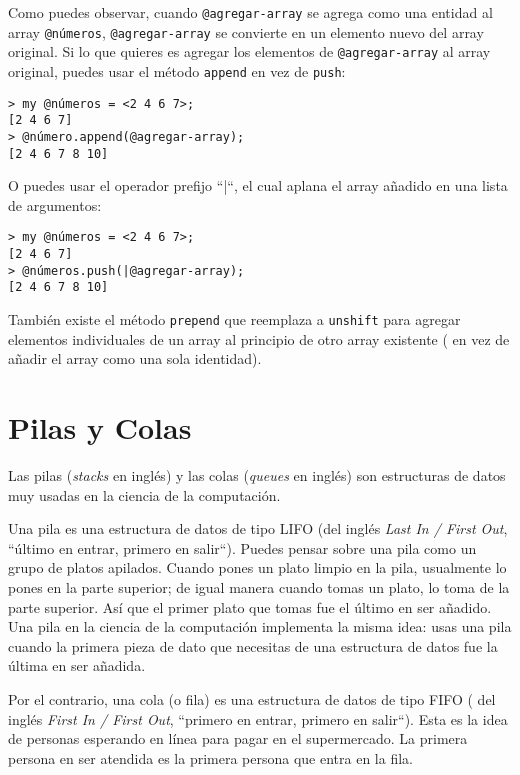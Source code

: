 Como puedes observar, cuando \verb|@agregar-array| se agrega
como una entidad al array \verb|@números|, \verb|@agregar-array|
se convierte en un elemento nuevo del array original. Si lo que 
quieres es agregar los elementos de \verb|@agregar-array| 
al array original, puedes usar el método {\tt append} en vez 
de {\tt push}:

\begin{lstlisting}
> my @números = <2 4 6 7>;
[2 4 6 7]
> @número.append(@agregar-array);
[2 4 6 7 8 10]
\end{lstlisting}

O puedes usar el operador prefijo ``|``, el cual aplana
el array añadido en una lista de argumentos:

\begin{lstlisting}
> my @números = <2 4 6 7>;
[2 4 6 7]
> @números.push(|@agregar-array);
[2 4 6 7 8 10]
\end{lstlisting}

También existe el método {\tt prepend} que reemplaza 
a {\tt unshift} para agregar elementos individuales 
de un array al principio de otro array existente (
en vez de añadir el array como una sola identidad).

\section{Pilas y Colas}
\label{stacks_queues}

Las pilas (\emph{stacks} en inglés) y las colas ({\emph{queues} en inglés}) son 
estructuras de datos muy usadas en la ciencia de la computación.

Una pila es una estructura de datos de tipo LIFO (del inglés 
\emph{Last In / First Out}, ``último en entrar, primero en salir``).
Puedes pensar sobre una pila como un grupo de platos apilados. Cuando
pones un plato limpio en la pila, usualmente lo pones en la parte superior;
de igual manera cuando tomas un plato, lo toma de la parte superior.
Así que el primer plato que tomas fue el último en ser añadido. Una pila
en la ciencia de la computación implementa la misma idea: usas una pila
cuando la primera pieza de dato que necesitas de una estructura de datos fue
la última en ser añadida.

Por el contrario, una cola (o fila) es una estructura de datos de tipo FIFO (
del inglés \emph{First In / First Out}, ``primero en entrar, primero en
salir``). Esta es la idea de personas esperando en línea para pagar en el
supermercado. La primera persona en ser atendida es la primera
persona que entra en la fila.

